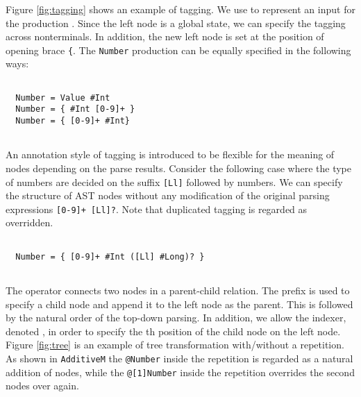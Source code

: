 \documentclass[JIP]{ipsj}
\begin{document}
Figure \ref{fig:tagging} shows an example of tagging. We use  to represent an input  for the production . Since the left node is a global state, we can specify the tagging across nonterminals. In addition, the new left node is set at the position of opening brace \verb|{|. The {\tt Number} production can be equally specified in the following ways:

{\small \begin{verbatim}

  Number = Value #Int
  Number = { #Int [0-9]+ } 
  Number = { [0-9]+ #Int} 
  
\end{verbatim}}

An annotation style of tagging is introduced to be flexible for the meaning of nodes depending on the parse results. Consider the following case where the type of numbers are decided on the suffix \verb|[Ll]| followed by numbers. We can specify the structure of AST nodes  without any modification of the original parsing expressions \verb|[0-9]+ [Ll]?|. Note that duplicated tagging is regarded as overridden. 

{\small \begin{verbatim}

  Number = { [0-9]+ #Int ([Ll] #Long)? } 
  
\end{verbatim}}

The  operator connects two nodes in a parent-child relation. The prefix  is used to specify a child node and append it to the left node as the parent. This is followed by the natural order of the top-down parsing. In addition, we allow the indexer, denoted , in order to specify the th position of the child node on the left node. Figure \ref{fig:tree} is an example of tree transformation with/without a repetition. As shown in {\tt AdditiveM} the {\tt @Number} inside the repetition is regarded as a natural addition of nodes, while the {\tt @[1]Number} inside the repetition overrides the second nodes over again.  
\end{document}
